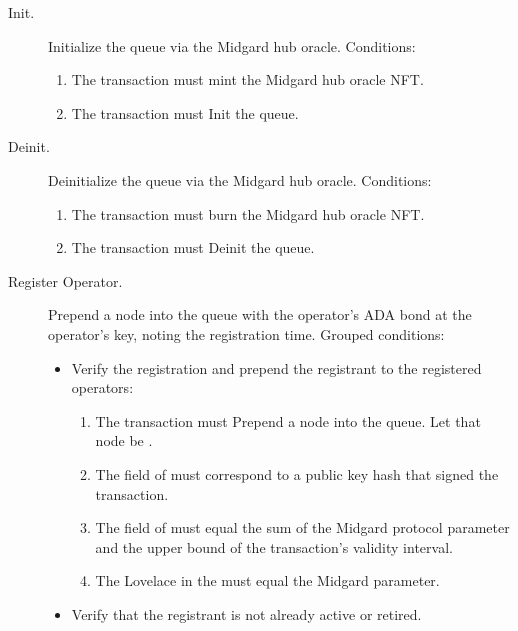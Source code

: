 \documentclass[../midgard.tex]{subfiles}
\begin{document}
\begin{description}
    \item[Init.] Initialize the  queue via the Midgard hub oracle.
      Conditions:
        \begin{enumerate}
            \item The transaction must mint the Midgard hub oracle NFT.
            \item The transaction must Init the  queue.
        \end{enumerate}
    \item[Deinit.] Deinitialize the  queue via the Midgard hub oracle.
      Conditions:
        \begin{enumerate}
            \item The transaction must burn the Midgard hub oracle NFT.
            \item The transaction must Deinit the  queue.
        \end{enumerate}
    \item[Register Operator.] Prepend a node into the  queue with the operator's ADA bond at the operator's key, noting the registration time.
      Grouped conditions:
        \begin{itemize}
            \item Verify the registration and prepend the registrant to the registered operators:
            \begin{enumerate}
                \item The transaction must Prepend a node into the  queue.
                  Let that node be .
                \item The  field of  must correspond to a public key hash that signed the transaction.
                \item The  field of  must equal the sum of the Midgard  protocol parameter and the upper bound of the transaction's validity interval.
                \item The Lovelace in the  must equal the  Midgard parameter.
            \end{enumerate}
            \item Verify that the registrant is not already active or retired.

\end{itemize}
\end{description}
\end{document}
